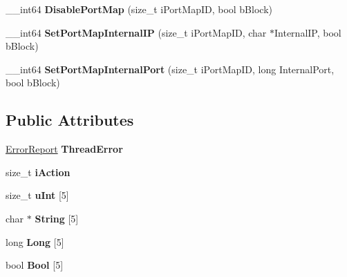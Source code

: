 \begin{DoxyCompactItemize}
\item 
\hypertarget{classcl_u_pn_p_thread_acf3d6c37114baa249f73e2ea253f09fe}{
\_\-\_\-int64 {\bfseries DisablePortMap} (size\_\-t iPortMapID, bool bBlock)}
\label{classcl_u_pn_p_thread_acf3d6c37114baa249f73e2ea253f09fe}

\item 
\hypertarget{classcl_u_pn_p_thread_af58c82d833887ddffa654f9c337f6506}{
\_\-\_\-int64 {\bfseries SetPortMapInternalIP} (size\_\-t iPortMapID, char $\ast$InternalIP, bool bBlock)}
\label{classcl_u_pn_p_thread_af58c82d833887ddffa654f9c337f6506}

\item 
\hypertarget{classcl_u_pn_p_thread_a633735df74dde68ce2b2b9a6dd7b2ef9}{
\_\-\_\-int64 {\bfseries SetPortMapInternalPort} (size\_\-t iPortMapID, long InternalPort, bool bBlock)}
\label{classcl_u_pn_p_thread_a633735df74dde68ce2b2b9a6dd7b2ef9}

\end{DoxyCompactItemize}
\subsection*{Public Attributes}
\begin{DoxyCompactItemize}
\item 
\hypertarget{classcl_u_pn_p_thread_ac2764bd293446c6246d2eef5b0f5092c}{
\hyperlink{class_error_report}{ErrorReport} {\bfseries ThreadError}}
\label{classcl_u_pn_p_thread_ac2764bd293446c6246d2eef5b0f5092c}

\item 
\hypertarget{classcl_u_pn_p_thread_a1174f5e949edd7eccdf1ffe20dfe10bb}{
size\_\-t {\bfseries iAction}}
\label{classcl_u_pn_p_thread_a1174f5e949edd7eccdf1ffe20dfe10bb}

\item 
\hypertarget{classcl_u_pn_p_thread_a2bb179476e60900a1659ff5d1bad9ce1}{
size\_\-t {\bfseries uInt} \mbox{[}5\mbox{]}}
\label{classcl_u_pn_p_thread_a2bb179476e60900a1659ff5d1bad9ce1}

\item 
\hypertarget{classcl_u_pn_p_thread_a1da3232b1340c813abe6293900b8fbbb}{
char $\ast$ {\bfseries String} \mbox{[}5\mbox{]}}
\label{classcl_u_pn_p_thread_a1da3232b1340c813abe6293900b8fbbb}

\item 
\hypertarget{classcl_u_pn_p_thread_ac237d9c56a08652fcf10f39285ffb13e}{
long {\bfseries Long} \mbox{[}5\mbox{]}}
\label{classcl_u_pn_p_thread_ac237d9c56a08652fcf10f39285ffb13e}

\item 
\hypertarget{classcl_u_pn_p_thread_a5a0ac9bac265d9b0f818bf4da481aa2b}{
bool {\bfseries Bool} \mbox{[}5\mbox{]}}
\label{classcl_u_pn_p_thread_a5a0ac9bac265d9b0f818bf4da481aa2b}

\end{DoxyCompactItemize}
